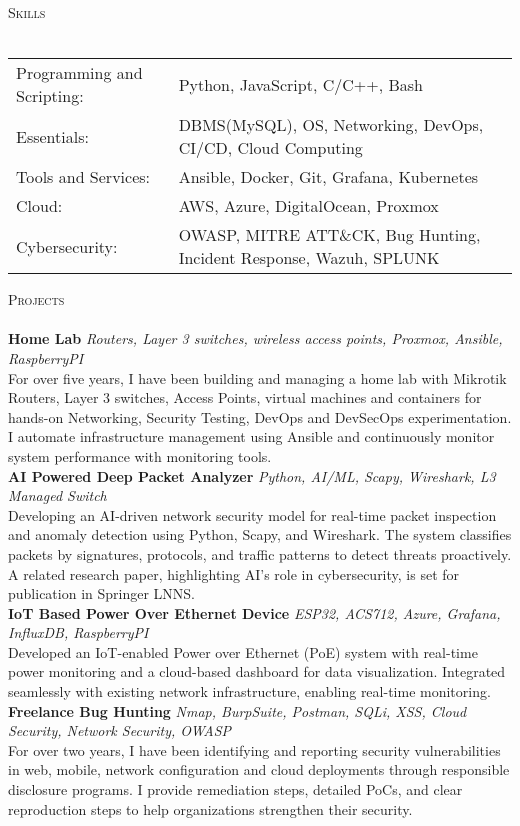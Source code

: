 \documentclass[a4paper]{article}
\newcommand{\lineunder} {
    \vspace*{-8pt} \\
    \hspace*{-18pt} \hrulefill \\
}
\newcommand{\header} [1] {
    {\hspace*{-18pt}\vspace*{6pt} \textsc{#1}}
    \vspace*{-6pt} \lineunder
}
\begin{document}
\header{Skills}
\begin{tabular}{ l l }
	Programming and Scripting: & Python, JavaScript, C/C++, Bash                                     \\
	Essentials:                & DBMS(MySQL), OS, Networking, DevOps, CI/CD, Cloud Computing         \\
	Tools and Services:        & Ansible, Docker, Git, Grafana, Kubernetes                           \\
	Cloud:                     & AWS, Azure, DigitalOcean, Proxmox                                   \\
	Cybersecurity:             & OWASP, MITRE ATT\&CK, Bug Hunting, Incident Response, Wazuh, SPLUNK \\
\end{tabular}
\vspace{2mm}

\header{Projects}
{\textbf{Home Lab}} {\sl Routers, Layer 3 switches, wireless access points, Proxmox, Ansible, RaspberryPI} \\
For over five years, I have been building and managing a home lab with Mikrotik Routers, Layer 3 switches, Access Points, virtual machines and containers for hands-on Networking, Security Testing, DevOps and DevSecOps experimentation. I automate infrastructure management using Ansible and continuously monitor system performance with monitoring tools.\\
\vspace*{2mm}
{\textbf{AI Powered Deep Packet Analyzer}} {\sl Python, AI/ML, Scapy, Wireshark, L3 Managed Switch} \\
Developing an AI-driven network security model for real-time packet inspection and anomaly detection using Python, Scapy, and Wireshark. The system classifies packets by signatures, protocols, and traffic patterns to detect threats proactively. A related research paper, highlighting AI’s role in cybersecurity, is set for publication in Springer LNNS.\\
\vspace*{2mm}
{\textbf{IoT Based Power Over Ethernet Device}} {\sl ESP32, ACS712, Azure, Grafana, InfluxDB, RaspberryPI} \\
Developed an IoT-enabled Power over Ethernet (PoE) system with real-time power monitoring and a cloud-based dashboard for data visualization. Integrated seamlessly with existing network infrastructure, enabling real-time monitoring.\\
\vspace*{2mm}
{\textbf{Freelance Bug Hunting}} {\sl Nmap, BurpSuite, Postman, SQLi, XSS, Cloud Security, Network Security, OWASP} \\
For over two years, I have been identifying and reporting security vulnerabilities in web, mobile, network configuration and cloud deployments through responsible disclosure programs. I provide remediation steps, detailed PoCs, and clear reproduction steps to help organizations strengthen their security.\\
\vspace*{2mm}



\ 
\end{document}
